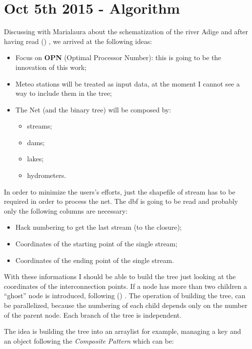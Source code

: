 \section{Oct 5th 2015 - Algorithm}

Discussing with Marialaura about the schematization of the river Adige
and after having read \citeauthor{wang2011:common}
(\citeyear{wang2011:common}) \cite{wang2011:common}, we arrived at the
following ideas:

\begin{itemize}
\item Focus on \textbf{OPN} (Optimal Processor Number): this is going
  to be the innovation of this work;
\item Meteo stations will be treated as input data, at the moment I
  cannot see a way to include them in the tree;
\item The Net (and the binary tree) will be composed by:
  \begin{itemize}
  \item streams;
  \item dams;
  \item lakes;
  \item hydrometers.
  \end{itemize}
\end{itemize}
In order to minimize the users's efforts, just the shapefile of stream
has to be required in order to process the net. The dbf is going to be
read and probably only the following columns are necessary:

\begin{itemize}
\item Hack numbering to get the last stream (to the closure);
\item Coordinates of the starting point of the single stream;
\item Coordinates of the ending point of the single stream.
\end{itemize}
With these informations I should be able to build the tree just
looking at the coordinates of the interconnection points. If a node
has more than two children a ``ghost'' node is introduced, following
\citeauthor{wang2011:common} (\citeyear{wang2011:common})
\cite{wang2011:common}. The operation of building the tree, can be
parallelized, because the numbering of each child depends only on the
number of the parent node. Each branch of the tree is independent.
\par\medskip
The idea is building the tree into an arraylist for example, managing
a key and an object following the \textit{Composite Pattern} which can
be:

